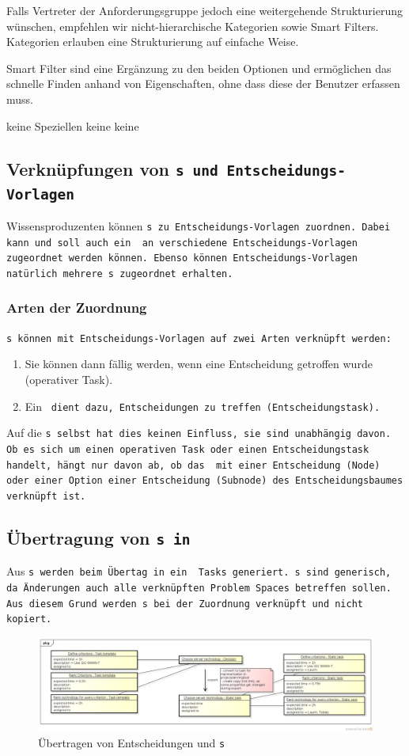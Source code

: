 {{				Falls Vertreter der Anforderungsgruppe jedoch eine weitergehende Strukturierung wünschen, 
				empfehlen wir nicht-hierarchische Kategorien sowie Smart Filters.
				Kategorien erlauben eine Strukturierung auf einfache Weise. 

				Smart Filter sind eine Ergänzung zu den beiden Optionen und ermöglichen das schnelle Finden anhand von Eigenschaften,
				ohne dass diese der Benutzer erfassen muss.
			}
			{keine Speziellen}
			{keine}
			{keine}
		}
		
		
		\subsection{Verknüpfungen von \tt s und Entscheidungs-Vorlagen}
			Wissensproduzenten können \tt s zu Entscheidungs-Vorlagen zuordnen.
			Dabei kann und soll auch ein \tt\ an verschiedene Entscheidungs-Vorlagen zugeordnet werden können.
			Ebenso können Entscheidungs-Vorlagen natürlich mehrere \tt s zugeordnet erhalten.
			
			\subsubsection{Arten der Zuordnung}
				\tt s können mit Entscheidungs-Vorlagen auf zwei Arten verknüpft werden:
				\begin{enumerate}
					\item Sie können dann fällig werden, wenn eine Entscheidung getroffen wurde (operativer Task).
					\item Ein \tt\ dient dazu, Entscheidungen zu treffen (Entscheidungstask).
				\end{enumerate}
				Auf die \tt s selbst hat dies keinen Einfluss, sie sind unabhängig davon. 
				Ob es sich um einen operativen Task oder einen Entscheidungstask handelt, hängt nur davon ab,
				ob das \tt\ mit einer Entscheidung (Node) oder einer Option einer Entscheidung (Subnode) des Entscheidungsbaumes verknüpft ist.

			\subsection{Übertragung von \tt s in \ppt}
				Aus \tt s werden beim Übertag in ein \ppt\ Tasks generiert.
				\tt s sind generisch, da Änderungen auch alle verknüpften Problem Spaces betreffen sollen.
				Aus diesem Grund werden \tt s bei der Zuordnung verknüpft und nicht kopiert.
				
				\begin{figure}[H]
					\includegraphics[width=\textwidth]{architecture/media/img/decisionTaskRelation.png}
					\centering
					\caption{Übertragen von Entscheidungen und \tt s}
					\label{fig:DecisionTaskRelation}
				\end{figure}
				
